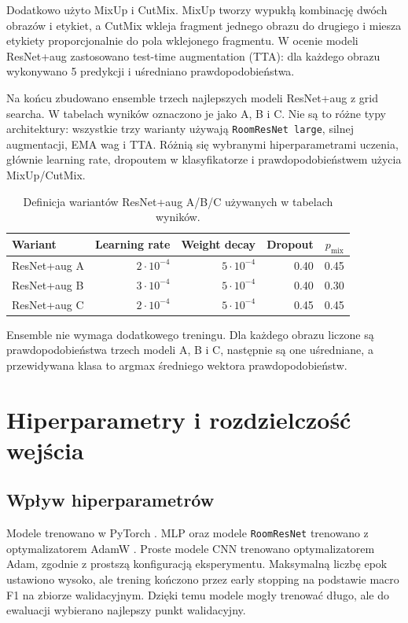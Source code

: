 \documentclass[12pt,a4paper]{article}
\begin{document}
Dodatkowo użyto MixUp i CutMix. MixUp tworzy wypukłą kombinację dwóch obrazów i etykiet, a CutMix wkleja fragment jednego obrazu do drugiego i miesza etykiety proporcjonalnie do pola wklejonego fragmentu. W ocenie modeli ResNet+aug zastosowano test-time augmentation (TTA): dla każdego obrazu wykonywano 5 predykcji i uśredniano prawdopodobieństwa.

Na końcu zbudowano ensemble trzech najlepszych modeli ResNet+aug z grid searcha. W tabelach wyników oznaczono je jako A, B i C. Nie są to różne typy architektury: wszystkie trzy warianty używają \texttt{RoomResNet large}, silnej augmentacji, EMA wag i TTA. Różnią się wybranymi hiperparametrami uczenia, głównie learning rate, dropoutem w klasyfikatorze i prawdopodobieństwem użycia MixUp/CutMix.

\begin{table}[H]
\centering
\caption{Definicja wariantów ResNet+aug A/B/C używanych w tabelach wyników.}
\label{tab:resnet_aug_variants}
\small
\begin{tabular}{@{}lrrrr@{}}
\toprule
Wariant & Learning rate & Weight decay & Dropout & \(p_{\text{mix}}\) \\
\midrule
ResNet+aug A & \(2 \cdot 10^{-4}\) & \(5 \cdot 10^{-4}\) & 0.40 & 0.45 \\
ResNet+aug B & \(3 \cdot 10^{-4}\) & \(5 \cdot 10^{-4}\) & 0.40 & 0.30 \\
ResNet+aug C & \(2 \cdot 10^{-4}\) & \(5 \cdot 10^{-4}\) & 0.45 & 0.45 \\
\bottomrule
\end{tabular}
\end{table}

Ensemble nie wymaga dodatkowego treningu. Dla każdego obrazu liczone są prawdopodobieństwa trzech modeli A, B i C, następnie są one uśredniane, a przewidywana klasa to argmax średniego wektora prawdopodobieństw.

\section{Hiperparametry i rozdzielczość wejścia}

\subsection{Wpływ hiperparametrów}

Modele trenowano w PyTorch \cite{pytorch}. MLP oraz modele \texttt{RoomResNet} trenowano z optymalizatorem AdamW \cite{adamw}. Proste modele CNN trenowano optymalizatorem Adam, zgodnie z prostszą konfiguracją eksperymentu. Maksymalną liczbę epok ustawiono wysoko, ale trening kończono przez early stopping na podstawie macro F1 na zbiorze walidacyjnym. Dzięki temu modele mogły trenować długo, ale do ewaluacji wybierano najlepszy punkt walidacyjny.
\end{document}
